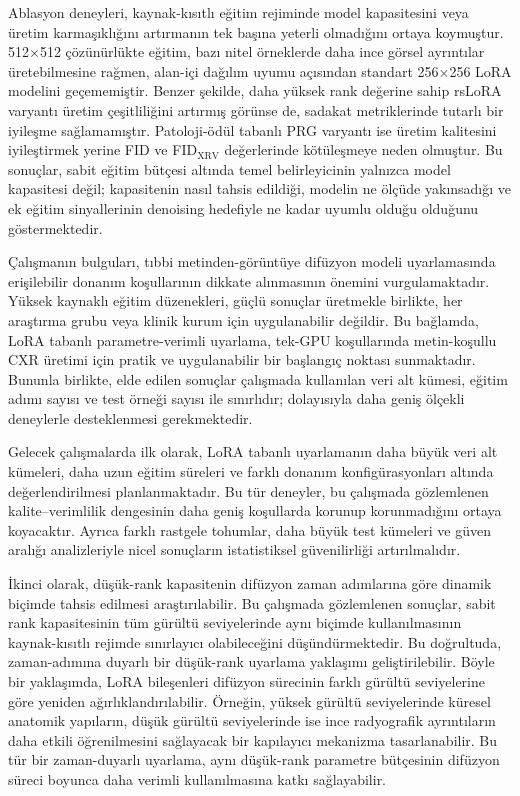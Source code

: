 \documentclass[11pt]{article}
\begin{document}
Ablasyon deneyleri, kaynak-kısıtlı eğitim rejiminde model kapasitesini veya
üretim karmaşıklığını artırmanın tek başına yeterli olmadığını ortaya koymuştur.
512$\times$512 çözünürlükte eğitim, bazı nitel örneklerde daha ince görsel
ayrıntılar üretebilmesine rağmen, alan-içi dağılım uyumu açısından standart
256$\times$256 LoRA modelini geçememiştir. Benzer şekilde, daha yüksek rank
değerine sahip rsLoRA varyantı üretim çeşitliliğini artırmış görünse de,
sadakat metriklerinde tutarlı bir iyileşme sağlamamıştır. Patoloji-ödül
tabanlı PRG varyantı ise üretim kalitesini iyileştirmek yerine FID ve
FID$_{\text{XRV}}$ değerlerinde kötüleşmeye neden olmuştur. Bu sonuçlar,
sabit eğitim bütçesi altında temel belirleyicinin yalnızca model kapasitesi
değil; kapasitenin nasıl tahsis edildiği, modelin ne ölçüde yakınsadığı ve ek
eğitim sinyallerinin denoising hedefiyle ne kadar uyumlu olduğu olduğunu
göstermektedir.

Çalışmanın bulguları, tıbbi metinden-görüntüye difüzyon modeli uyarlamasında
erişilebilir donanım koşullarının dikkate alınmasının önemini vurgulamaktadır.
Yüksek kaynaklı eğitim düzenekleri, güçlü sonuçlar üretmekle birlikte, her
araştırma grubu veya klinik kurum için uygulanabilir değildir. Bu bağlamda,
LoRA tabanlı parametre-verimli uyarlama, tek-GPU koşullarında metin-koşullu CXR
üretimi için pratik ve uygulanabilir bir başlangıç noktası sunmaktadır. Bununla
birlikte, elde edilen sonuçlar çalışmada kullanılan veri alt kümesi, eğitim
adımı sayısı ve test örneği sayısı ile sınırlıdır; dolayısıyla daha geniş
ölçekli deneylerle desteklenmesi gerekmektedir.

Gelecek çalışmalarda ilk olarak, LoRA tabanlı uyarlamanın daha büyük veri
alt kümeleri, daha uzun eğitim süreleri ve farklı donanım konfigürasyonları
altında değerlendirilmesi planlanmaktadır. Bu tür deneyler, bu çalışmada
gözlemlenen kalite--verimlilik dengesinin daha geniş koşullarda korunup
korunmadığını ortaya koyacaktır. Ayrıca farklı rastgele tohumlar, daha büyük
test kümeleri ve güven aralığı analizleriyle nicel sonuçların istatistiksel
güvenilirliği artırılmalıdır.

İkinci olarak, düşük-rank kapasitenin difüzyon zaman adımlarına göre dinamik
biçimde tahsis edilmesi araştırılabilir. Bu çalışmada gözlemlenen sonuçlar,
sabit rank kapasitesinin tüm gürültü seviyelerinde aynı biçimde kullanılmasının
kaynak-kısıtlı rejimde sınırlayıcı olabileceğini düşündürmektedir. Bu doğrultuda,
zaman-adımına duyarlı bir düşük-rank uyarlama yaklaşımı geliştirilebilir. Böyle
bir yaklaşımda, LoRA bileşenleri difüzyon sürecinin farklı gürültü seviyelerine
göre yeniden ağırlıklandırılabilir. Örneğin, yüksek gürültü seviyelerinde küresel
anatomik yapıların, düşük gürültü seviyelerinde ise ince radyografik ayrıntıların
daha etkili öğrenilmesini sağlayacak bir kapılayıcı mekanizma tasarlanabilir.
Bu tür bir zaman-duyarlı uyarlama, aynı düşük-rank parametre bütçesinin difüzyon
süreci boyunca daha verimli kullanılmasına katkı sağlayabilir.
\end{document}
